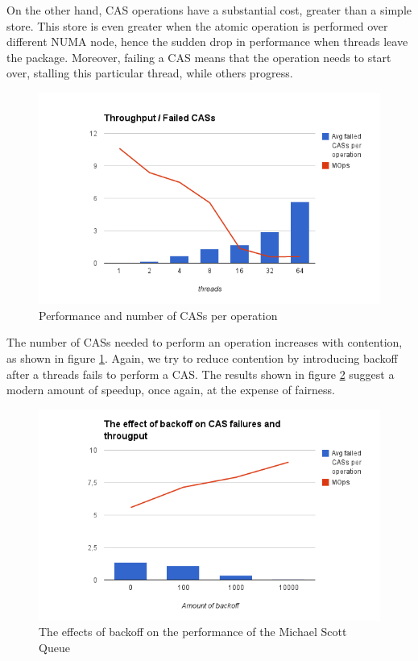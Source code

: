 On the other hand, CAS operations have a substantial cost, greater than a simple store. This store is even greater when the atomic operation is performed over different NUMA node, hence the sudden drop in performance when threads leave the package. Moreover, failing a CAS means that the operation needs to start over, stalling this particular thread, while others progress.  

\begin{figure}
 \centering
  \includegraphics[scale=0.7]{queue_msqueue_CAS_contention.png}
 \caption{ Performance and number of CASs per operation}
\label{queue_msqueue_CAS_contention}
\end{figure}

The number of CASs needed to perform an operation increases with contention, as shown in figure \ref{queue_msqueue_CAS_contention}. Again, we try to reduce contention by introducing backoff after a threads fails to perform a CAS. The results shown in figure \ref{queue_msqueue_backoff} suggest a modern amount of speedup, once again, at the expense of fairness. 

\begin{figure}
 \centering
  \includegraphics[scale=0.7]{queue_msqueue_backoff.png}
 \caption{ The effects of backoff on the performance of the Michael Scott Queue}
\label{queue_msqueue_backoff}
\end{figure}


